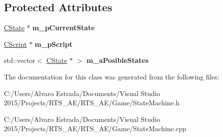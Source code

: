 \subsection*{Protected Attributes}
\begin{DoxyCompactItemize}
\item 
\hyperlink{class_c_state}{C\+State} $\ast$ {\bfseries m\+\_\+p\+Current\+State}\hypertarget{class_c_state_machine_a9515b7465db8f2740d91f2525d7d3508}{}\label{class_c_state_machine_a9515b7465db8f2740d91f2525d7d3508}

\item 
\hyperlink{class_c_script}{C\+Script} $\ast$ {\bfseries m\+\_\+p\+Script}\hypertarget{class_c_state_machine_a48c9f405ffe7ff9553ec108c51662508}{}\label{class_c_state_machine_a48c9f405ffe7ff9553ec108c51662508}

\item 
std\+::vector$<$ \hyperlink{class_c_state}{C\+State} $\ast$ $>$ {\bfseries m\+\_\+a\+Posible\+States}\hypertarget{class_c_state_machine_af894cabfda2bedfcf002bda0ecec5ae5}{}\label{class_c_state_machine_af894cabfda2bedfcf002bda0ecec5ae5}

\end{DoxyCompactItemize}


The documentation for this class was generated from the following files\+:\begin{DoxyCompactItemize}
\item 
C\+:/\+Users/\+Alvaro Estrada/\+Documents/\+Visual Studio 2015/\+Projects/\+R\+T\+S\+\_\+\+A\+E/\+R\+T\+S\+\_\+\+A\+E/\+Game/State\+Machine.\+h\item 
C\+:/\+Users/\+Alvaro Estrada/\+Documents/\+Visual Studio 2015/\+Projects/\+R\+T\+S\+\_\+\+A\+E/\+R\+T\+S\+\_\+\+A\+E/\+Game/State\+Machine.\+cpp\end{DoxyCompactItemize}
